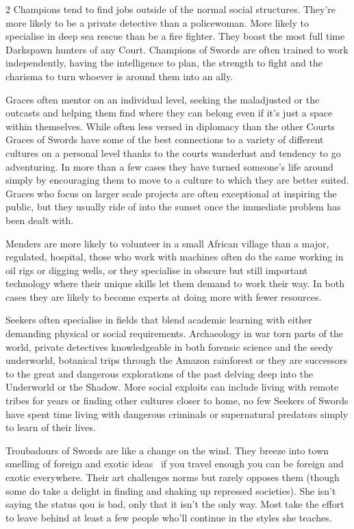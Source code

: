 \begin{multicols}{2}
Champions tend to find jobs outside of the normal social structures. They're more likely to be a private detective than a policewoman. More likely to specialise in deep sea rescue than be a fire fighter. They boast the most full time Darkspawn hunters of any Court. Champions of Swords are often trained to work independently, having the intelligence to plan, the strength to fight and the charisma to turn whoever is around them into an ally.

Graces often mentor on an individual level, seeking the maladjusted or the outcasts and helping them find where they can belong even if it's just a space within themselves. While often less versed in diplomacy than the other Courts Graces of Swords have some of the best connections to a variety of different cultures on a personal level thanks to the courts wanderlust and tendency to go adventuring. In more than a few cases they have turned someone's life around simply by encouraging them to move to a culture to which they are better suited. Graces who focus on larger scale projects are often exceptional at inspiring the public, but they usually ride of into the sunset once the immediate problem has been dealt with.

Menders are more likely to volunteer in a small African village than a major, regulated, hospital, those who work with machines often do the same working in oil rigs or digging wells, or they specialise in obscure but still important technology where their unique skills let them demand to work their way. In both cases they are likely to become experts at doing more with fewer resources.

Seekers often specialise in fields that blend academic learning with either demanding physical or social requirements. Archaeology in war torn parts of the world, private detectives knowledgeable in both forensic science and the seedy underworld, botanical trips through the Amazon rainforest or they are successors to the great and dangerous explorations of the past delving deep into the Underworld or the Shadow. More social exploits can include living with remote tribes for years or finding other cultures closer to home, no few Seekers of Swords have spent time living with dangerous criminals or supernatural predators simply to learn of their lives.

Troubadours of Swords are like a change on the wind. They breeze into town smelling of foreign and exotic ideas \textendash\, if you travel enough you can be foreign and exotic everywhere. Their art challenges norms but rarely opposes them (though some do take a delight in finding and shaking up repressed societies). She isn't saying the status qou is bad, only that it isn't the only way. Most take the effort to leave behind at least a few people who'll continue in the styles she teaches. 


\end{multicols}
